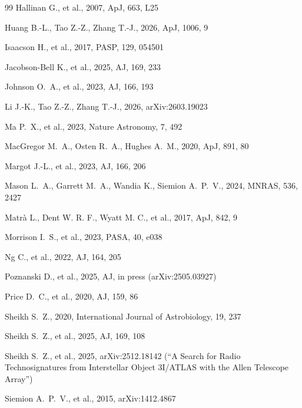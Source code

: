 \documentclass{openjournal}
\begin{document}
\begin{thebibliography}{99}
 Hallinan G., et al., 2007, ApJ, 663, L25

 Huang B.-L., Tao Z.-Z., Zhang T.-J., 2026, ApJ, 1006, 9

 Isaacson H., et al., 2017, PASP, 129, 054501

 Jacobson-Bell K., et al., 2025, AJ, 169, 233

 Johnson O.~A., et al., 2023, AJ, 166, 193


 Li J.-K., Tao Z.-Z., Zhang T.-J., 2026, arXiv:2603.19023

 Ma P.~X., et al., 2023, Nature Astronomy, 7, 492

 MacGregor M.~A., Osten R.~A., Hughes A.~M., 2020, ApJ, 891, 80

 Margot J.-L., et al., 2023, AJ, 166, 206

 Mason L.~A., Garrett M.~A., Wandia K., Siemion A.~P.~V., 2024, MNRAS, 536, 2427

 Matrà L., Dent W. R. F., Wyatt M. C., et al., 2017, ApJ, 842, 9

 Morrison I.~S., et al., 2023, PASA, 40, e038

 Ng C., et al., 2022, AJ, 164, 205

 Poznanski D., et al., 2025, AJ, in press (arXiv:2505.03927)

 Price D.~C., et al., 2020, AJ, 159, 86

 Sheikh S.~Z., 2020, International Journal of Astrobiology, 19, 237

 Sheikh S.~Z., et al., 2025, AJ, 169, 108

 Sheikh S.~Z., et al., 2025, arXiv:2512.18142 (``A Search for Radio Technosignatures from Interstellar Object 3I/ATLAS with the Allen Telescope Array'')

 Siemion A.~P.~V., et al., 2015, arXiv:1412.4867


\end{thebibliography}
\end{document}
